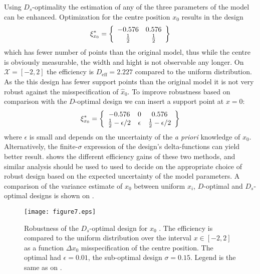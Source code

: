 \documentclass[12pt]{iopart}
\begin{document}
Using $D_s$-optimality the estimation of any of the three parameters of the model  can be enhanced. Optimization for the centre position $x_0$ results in the design
\begin{equation}
\xi^*_{x_0} = \left\{
  \begin{array}{c c}
    -0.576 & 0.576 \\
    \frac{1}{2} & \frac{1}{2}\\
  \end{array} \right \}
\end{equation}
which has fewer number of points than the original model, thus while the centre is obviously measurable, the width and hight is not observable any longer.  On $\mathcal{X} = [-2,2]$ the efficiency is $D_\mathrm{eff} = 2.227$ compared to the uniform distribution. As the this design has fewer support points than the original model it is not very robust against the misspecification of $\hat x_0$. To improve robustness based on comparison with the $D$-optimal design we can insert a support point at $x=0$:
\begin{equation}
\xi^*_{x_0} = \left\{
  \begin{array}{c c c}
    -0.576 & 0 & 0.576 \\
    \frac{1}{2}-\epsilon/2 & \epsilon & \frac{1}{2}-\epsilon/2\\
  \end{array} \right \}
\label{eq:dsx0robust}
\end{equation}
where $\epsilon$ is small and depends on the uncertainty of the \textit{a priori} knowledge of $x_0$. Alternatively, the finite-$\sigma$ expression of the design's delta-functions can yield better result.  shows the different efficiency gains of these two methods, and similar analysis should be used to used to decide on the appropriate choice of robust design based on the expected uncertainty of the model parameters. A comparison of the variance estimate of $x_0$ between uniform $x_i$, $D$-optimal and $D_s$-optimal designs is shown on .

\begin{figure}
\texttt{[image: figure7.eps]}
\caption{Robustness of the $D_s$-optimal design for $x_0$ . The efficiency is compared to the uniform distribution over the interval $x\in [-2,2]$ as a function $\Delta x_0$ misspecification of the centre position. The optimal had $\epsilon = 0.01$, the sub-optimal design $\sigma = 0.15$. Legend is the same as on .}
\label{fig:dsx0robust}
\end{figure}
\end{document}
